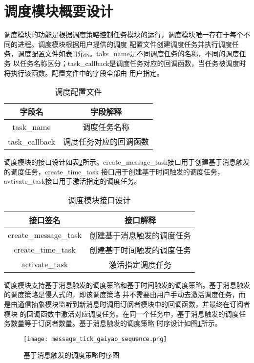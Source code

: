 \section{调度模块概要设计}
调度模块的功能是根据调度策略控制任务模块的运行，调度模块唯一存在于每个不同的进程。调度模块根据用户提供的调度
配置文件创建调度任务并执行调度任务，调度配置文件如表\ref{schedule_config_file}所示。taks\_name是不同调度任务的名称，不同的调度任务
以任务名称区分；task\_callback是调度任务对应的回调函数，当任务被调度时将执行该函数。配置文件中的字段全部由
用户指定。
\begin{table}[H]
  \centering\small
  \caption{调度配置文件}
  \label{schedule_config_file}
  \begin{tabular}{cc}
    \toprule
    字段名 & 字段解释 \\
    \midrule
    task\_name & 调度任务名称\\
    task\_callback & 调度任务对应的回调函数\\
    \bottomrule
  \end{tabular}
\end{table}

调度模块的接口设计如表\ref{schedule_interface}所示。create\_message\_task接口用于创建基于消息触发的调度任务，create\_time\_task
接口用于创建基于时间触发的调度任务，avtivate\_task接口用于激活指定的调度任务。
\begin{table}[H]
  \centering\small
  \caption{调度模块接口设计}
  \label{schedule_interface}
  \begin{tabular}{cc}
    \toprule
    接口签名 & 接口解释 \\
    \midrule
    create\_message\_task & 创建基于消息触发的调度任务 \\
    create\_time\_task & 创建基于时间触发的调度任务 \\
    activate\_task & 激活指定调度任务 \\
    \bottomrule
  \end{tabular}
\end{table}

调度模块支持基于消息触发的调度策略和基于时间触发的调度策略。基于消息触发的调度策略是侵入式的，即该调度策略
并不需要由用户手动去激活调度任务，而是由通信抽象模块监听到新消息时调用订阅者模块中的回调函数，并最终在订阅者模块
的回调函数中激活对应调度任务。在同一个任务中，基于消息触发的调度任务数量等于订阅者数量。基于消息触发的调度策略
时序设计如图\ref{message_tick_gaiyao_sequence}所示。
\begin{figure}[H]
  \centering
  \texttt{[image: message\_tick\_gaiyao\_sequence.png]}
  \caption{基于消息触发的调度策略时序图}
  \label{message_tick_gaiyao_sequence}
\end{figure}

